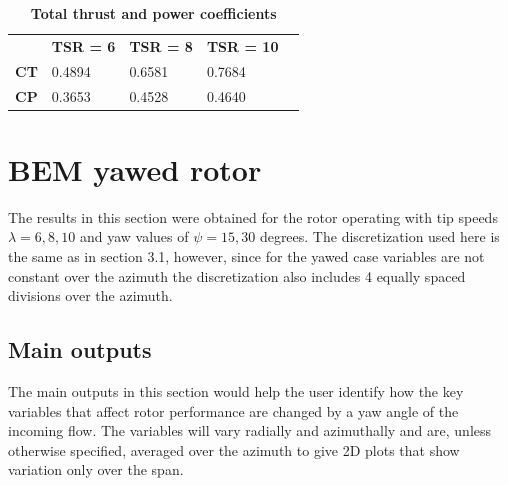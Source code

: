 \begin{table}[htpb]
\caption{\textbf{Total thrust and power coefficients }}
\begin{tabular}{lllll}
\cline{1-4}
\multicolumn{1}{|l|}{}                            & \multicolumn{1}{l|}{\textbf{TSR = 6}} & \multicolumn{1}{l|}{\textbf{TSR = 8}} & \multicolumn{1}{l|}{\textbf{TSR = 10}} &  \\ \cline{1-4}
\multicolumn{1}{|l|}{\textbf{CT }}   & \multicolumn{1}{l|}{0.4894}          & \multicolumn{1}{l|}{0.6581}          & \multicolumn{1}{l|}{0.7684}           &  \\ \cline{1-4}
\multicolumn{1}{|l|}{\textbf{CP}} & \multicolumn{1}{l|}{0.3653}         & \multicolumn{1}{l|}{0.4528}         & \multicolumn{1}{l|}{0.4640}          &  \\ \cline{1-4}
\end{tabular}
\label{total_coef_alligned}
\end{table}


\section{BEM yawed rotor }

The results in this section were obtained for the rotor operating with tip speeds $\lambda = 6,8,10$ and yaw values of $\psi = 15, 30$ degrees. The discretization used here is the same as in section 3.1, however, since for the yawed case variables are not constant over the azimuth the discretization also includes 4 equally spaced divisions over the azimuth. 


\subsection{Main outputs}

The main outputs in this section would help the user identify how the key variables that affect rotor performance are changed by a yaw angle of the incoming flow. The variables will vary radially and azimuthally and are, unless otherwise specified, averaged over the azimuth to give 2D plots that show variation only over the span.

